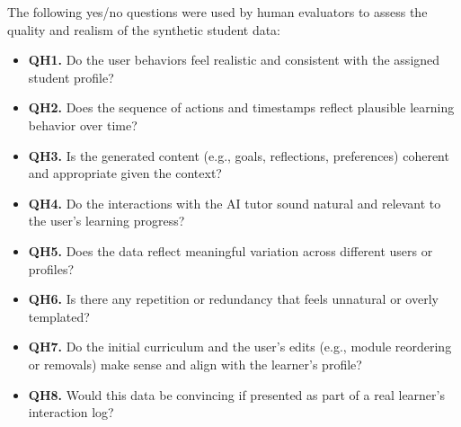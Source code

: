 \documentclass[sigconf]{acmart}
\begin{document}
The following yes/no questions were used by human evaluators to assess the quality and realism of the synthetic student data:

{\footnotesize
\begin{itemize}
    \item \textbf{QH1.} Do the user behaviors feel realistic and consistent with the assigned student profile?
    \item \textbf{QH2.} Does the sequence of actions and timestamps reflect plausible learning behavior over time?
    \item \textbf{QH3.} Is the generated content (e.g., goals, reflections, preferences) coherent and appropriate given the context?
    \item \textbf{QH4.} Do the interactions with the AI tutor sound natural and relevant to the user's learning progress?
    \item \textbf{QH5.} Does the data reflect meaningful variation across different users or profiles?
    \item \textbf{QH6.} Is there any repetition or redundancy that feels unnatural or overly templated?
    \item \textbf{QH7.} Do the initial curriculum and the user's edits (e.g., module reordering or removals) make sense and align with the learner's profile?
    \item \textbf{QH8.} Would this data be convincing if presented as part of a real learner's interaction log?
\end{itemize}
}
\end{document}
